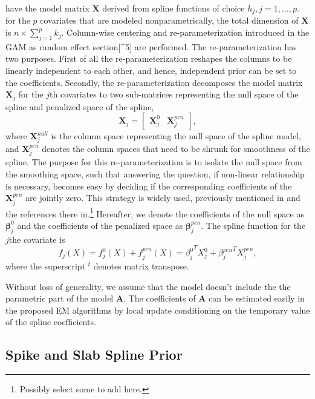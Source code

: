 \documentclass[AMA,STIX1COL,]{WileyNJD-v2}
\begin{document}
have the model matrix \(\boldsymbol{X}\) derived from spline functions
of choice \(h_j, j = 1, \dots, p.\) for the \(p\) covariates that are
modeled nonparametrically, the total dimension of \(\boldsymbol{X}\) is
\(n \times \sum\limits_{j=1}^p k_j\). Column-wise centering and
re-parameterization introduced in the GAM as random effect
section{[}\^{}5{]} are performed. The re-parameterization has two
purposes. First of all the re-parameterization reshapes the columns to
be linearly independent to each other, and hence, independent prior can
be set to the coefficients. Secondly, the re-parameterization decomposes
the model matrix \(\boldsymbol{X}_j\) for the \(j\)th covariates to two
sub-matrices representing the null space of the spline and penalized
space of the spline, \[
\boldsymbol{X}_j = \begin{bmatrix}
\boldsymbol{X}_j^{0} & \boldsymbol{X}_j^{pen}
\end{bmatrix},
\] where \(\boldsymbol{X}_j^{null}\) is the column space representing
the null space of the spline model, and \(\boldsymbol{X}_j^{pen}\)
denotes the column spaces that need to be shrunk for smoothness of the
spline. The purpose for this re-parameterization is to isolate the null
space from the smoothing space, such that answering the question, if
non-linear relationship is necessary, becomes easy by deciding if the
corresponding coefficients of the \(\boldsymbol{X}_j^{pen}\) are jointly
zero. This strategy is widely used, previously mentioned in
\citet{Scheipl2012} and the references there in.\footnote{Possibly
  select some to add here.} Hereafter, we denote the coefficients of the
null space as \(\boldsymbol{\beta}^{0}_j\) and the coefficients of the
penalized space as \(\boldsymbol{\beta}^{pen}_j\). The spline function
for the \(j\)the covariate is \[
f_j(X) = f_j^0(X) + f_j^{pen}(X) = {\beta_j^0}^T X_j^0 + {\beta_j^{pen}}^T X_j^{pen},
\] where the superscript \(^t\) denotes matrix transpose.

Without loss of generality, we assume that the model doesn't include the
the parametric part of the model \(\boldsymbol{A}\). The coefficients of
\(\boldsymbol{A}\) can be estimated easily in the proposed EM algorithms
by local update conditioning on the temporary value of the spline
coefficients.

\hypertarget{spike-and-slab-spline-prior}{%
\subsection{Spike and Slab Spline
Prior}\label{spike-and-slab-spline-prior}}
\end{document}
